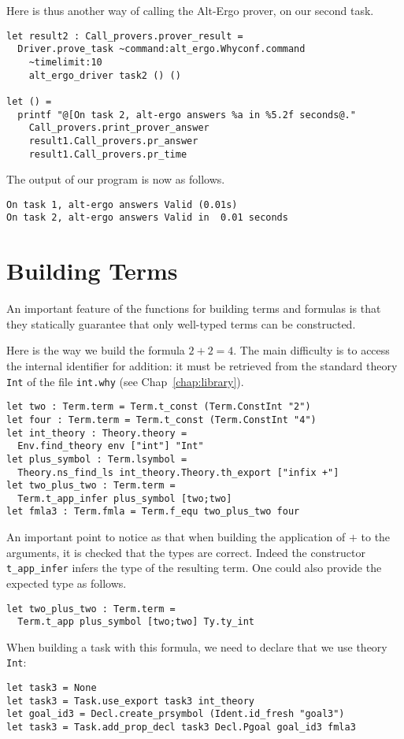 Here is thus another way of calling the Alt-Ergo prover, on our second
task.
\begin{verbatim}
let result2 : Call_provers.prover_result =
  Driver.prove_task ~command:alt_ergo.Whyconf.command
    ~timelimit:10
    alt_ergo_driver task2 () ()

let () =
  printf "@[On task 2, alt-ergo answers %a in %5.2f seconds@."
    Call_provers.print_prover_answer
    result1.Call_provers.pr_answer
    result1.Call_provers.pr_time
\end{verbatim}
The output of our program is now as follows.
\begin{verbatim}
On task 1, alt-ergo answers Valid (0.01s)
On task 2, alt-ergo answers Valid in  0.01 seconds
\end{verbatim}

\section{Building Terms}

An important feature of the functions for building terms and formulas
is that they statically guarantee that only well-typed terms can be
constructed.

Here is the way we build the formula $2+2=4$. The main difficulty is to
access the internal identifier for addition: it must be retrieved from
the standard theory \texttt{Int} of the file \texttt{int.why} (see
Chap~\ref{chap:library}).
\begin{verbatim}
let two : Term.term = Term.t_const (Term.ConstInt "2")
let four : Term.term = Term.t_const (Term.ConstInt "4")
let int_theory : Theory.theory =
  Env.find_theory env ["int"] "Int"
let plus_symbol : Term.lsymbol =
  Theory.ns_find_ls int_theory.Theory.th_export ["infix +"]
let two_plus_two : Term.term =
  Term.t_app_infer plus_symbol [two;two]
let fmla3 : Term.fmla = Term.f_equ two_plus_two four
\end{verbatim}
An important point to notice as that when building the application of
$+$ to the arguments, it is checked that the types are correct. Indeed
the constructor \texttt{t\_app\_infer} infers the type of the resulting
term. One could also provide the expected type as follows.
\begin{verbatim}
let two_plus_two : Term.term =
  Term.t_app plus_symbol [two;two] Ty.ty_int
\end{verbatim}

When building a task with this formula, we need to declare that we use
theory \texttt{Int}:
\begin{verbatim}
let task3 = None
let task3 = Task.use_export task3 int_theory
let goal_id3 = Decl.create_prsymbol (Ident.id_fresh "goal3")
let task3 = Task.add_prop_decl task3 Decl.Pgoal goal_id3 fmla3
\end{verbatim}


